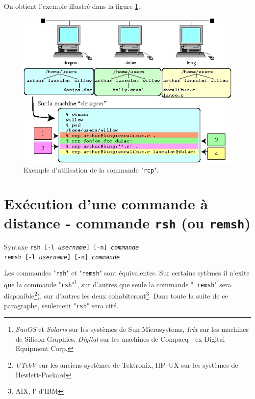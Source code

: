 On obtient l'exemple illustr{\'e} dans la figure \ref{fig-cmdnet-exrcp}.

\begin{figure}
\centering
\includegraphics{./_Images/cmds-net/exrcp.jpg}
\caption{\label{fig-cmdnet-exrcp}Exemple d'utilisation de la commande "{\tt rcp}".}
\end{figure}


\section{Ex{\'e}cution d'une commande {\`a} distance - commande {\tt rsh} (ou {\tt remsh})}

\begin{definition}{Syntaxe}
{\tt rsh [-l {\it username}] [-n] {\it commande}}\\
{\tt remsh [-l {\it username}] [-n] {\it commande}}
\end{definition}

Les commandes "\texttt{rsh}" et
"\texttt{remsh}" sont {\'e}quivalentes.
Sur certains syt{\`e}mes il n'exite que la commande
"\texttt{rsh}"\footnote{\textsl{SunOS} et  \textsl{Solaris} sur les
syst{\`e}mes de Sun Microsystems, \textsl{Irix} sur les machines de
Silicon Graphics, \textsl{Digital {\Unix}} sur les machines de Compacq -
ex Digital Equipment Corp.}, sur d'autres que seule la commande "{\tt
remsh}" sera disponible\footnote{\textsl{UTekV} sur les anciens
syst{\`e}mes {\Unix} de Tektronix, \textsf{HP--UX} sur les syst{\`e}mes
de Hewlett-Packard}), sur d'autres les deux cohabiteront\footnote{AIX,
l'{\Unix} d'IBM}. Dans toute la suite de ce paragraphe, seulement
"\texttt{rsh}" sera cit{\'e}.

